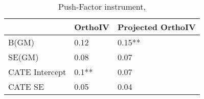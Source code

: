 \begin{table}\centering\caption{Push-Factor instrument, }\begin{tabular}{lll}
\toprule
                & OrthoIV   & Projected OrthoIV   \\
\midrule
 B(GM)          & 0.12      & 0.15**              \\
 SE(GM)         & 0.08      & 0.07                \\
 CATE Intercept & 0.1**     & 0.07                \\
 CATE SE        & 0.05      & 0.04                \\
\bottomrule
\end{tabular}\end{table}
